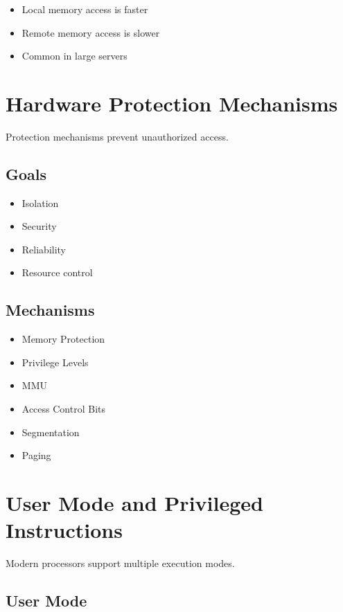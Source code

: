 \begin{itemize}
\item Local memory access is faster
\item Remote memory access is slower
\item Common in large servers
\end{itemize}

\section{Hardware Protection Mechanisms}

Protection mechanisms prevent unauthorized access.

\subsection{Goals}

\begin{itemize}
\item Isolation
\item Security
\item Reliability
\item Resource control
\end{itemize}

\subsection{Mechanisms}

\begin{itemize}
\item Memory Protection
\item Privilege Levels
\item MMU
\item Access Control Bits
\item Segmentation
\item Paging
\end{itemize}

\section{User Mode and Privileged Instructions}

Modern processors support multiple execution modes.

\subsection{User Mode}

